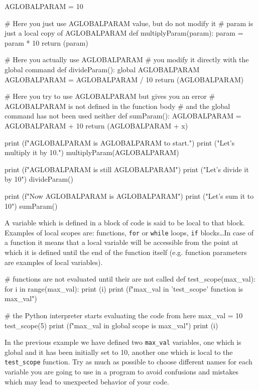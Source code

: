 \begin{ipythonnon}
AGLOBALPARAM = 10

# Here you just use AGLOBALPARAM value, but do not modify it
# param is just a local copy of AGLOBALPARAM
def multiplyParam(param):
    param = param * 10
    return (param)

# Here you actually use AGLOBALPARAM
# you modify it directly with the global command
def divideParam():
    global AGLOBALPARAM
    AGLOBALPARAM = AGLOBALPARAM / 10
    return (AGLOBALPARAM)

# Here you try to use AGLOBALPARAM but gives you an error
# AGLOBALPARAM is not defined in the function body
# and the global command has not been used neither
def sumParam():
    AGLOBALPARAM = AGLOBALPARAM + 10
    return (AGLOBALPARAM + x)

print (f"AGLOBALPARAM is {AGLOBALPARAM} to start.")
print ("Let's multiply it by 10.")
multiplyParam(AGLOBALPARAM)

print (f"AGLOBALPARAM is still {AGLOBALPARAM}")
print ("Let's divide it by 10")
divideParam()

print (f"Now AGLOBALPARAM is {AGLOBALPARAM}")
print ("Let's sum it to 10")
sumParam()
\end{ipythonnon}

A variable which is defined in a block of code is said to be local to that block. Examples of local scopes are: functions, \texttt{for} or \texttt{while} loops, \texttt{if} blocks\ldots In case of a function it means that a local variable will be accessible from the point at which it is defined until the end of the function itself (e.g. function parameters are examples of local variables).

\begin{ipythonnon}
# functions are not evaluated until their are not called
def test_scope(max_val):
    for i in range(max_val):
        print (i)
    print (f"max_val in 'test_scope' function is {max_val}")

# the Python interpreter starts evaluating the code from here
max_val = 10
test_scope(5)
print (f"max_val in global scope is {max_val}")
print (i)
\end{ipythonnon}

In the previous example we have defined two \texttt{max\_val} variables, one which is global and it has been initially set to 10, another one which is local to the \texttt{test\_scope} function.
Try as much as possible to choose different names for each variable you are going to use in a program to avoid confusions and mistakes which may lead to unexpected behavior of your code.

